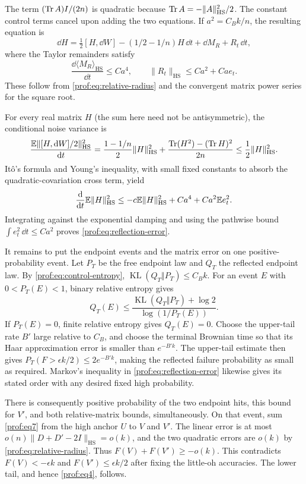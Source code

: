 The term $(\operatorname{Tr} A)I/(2n)$ is quadratic
because $\operatorname{Tr} A=-\|A\|_{\mathrm{HS}}^2/2$.  The constant control
terms cancel upon adding the two equations.  If
$a^2=C_Bk/n$, the resulting equation is
\[
 \dd H=\tfrac12[H,\dd W]-(1/2-1/n)H\,\dd t
       +\dd M_R+R_t\,\dd t,
\]
where the Taylor remainders satisfy
\[
 \frac{\dd\langle M_R\rangle_{\mathrm{HS}}}{\dd t}\le Ca^4,
 \qquad \|R_t\|_{\mathrm{HS}}\le Ca^2+Ca e_t.
\]
These follow from \eqref{prof:eq:relative-radius} and the convergent
matrix power series for the square root.

For every real matrix $H$
(the sum here need not be antisymmetric), the conditional noise
variance is
\[
 \frac{\mathbb E\|[H,\mathrm d W]/2\|_{\mathrm{HS}}^2}{\mathrm d t}
 =\frac{1-1/n}{2}\|H\|_{\mathrm{HS}}^2
 +\frac{\operatorname{Tr}(H^2)-(\operatorname{Tr} H)^2}{2n}
 \le\frac12\|H\|_{\mathrm{HS}}^2.
\]
It\^o's formula and Young's inequality, with small fixed constants
to absorb the quadratic-covariation cross term, yield
\[
 \frac{\mathrm d}{\mathrm d t}\mathbb E\|H\|_{\mathrm{HS}}^2
 \le-c\mathbb E\|H\|_{\mathrm{HS}}^2
      +Ca^4+Ca^2\mathbb E e_t^2.
\]
Integrating against the exponential damping and using the pathwise
bound $\int e_t^2\,\dd t\le Ca^2$ proves
\eqref{prof:eq:reflection-error}.

It remains to put the endpoint events and the matrix error on one
positive-probability event. Let $P_T$ be the free endpoint law and
$Q_T$ the reflected endpoint law. By \eqref{prof:eq:control-entropy},
$\operatorname{KL}(Q_T\Vert P_T)\le C_Bk$. For an event $E$ with
$0<P_T(E)<1$, binary relative entropy gives
\[
 Q_T(E)\le
 \frac{\operatorname{KL}(Q_T\Vert P_T)+\log2}
      {\log(1/P_T(E))}.
\]
If $P_T(E)=0$, finite relative entropy gives $Q_T(E)=0$.
Choose the upper-tail rate $B'$ large relative to $C_B$, and choose
the terminal Brownian time so that its Haar approximation error is
smaller than $e^{-B'k}$. The upper-tail estimate then gives
$P_T(F>\epsilon k/2)\le2e^{-B'k}$, making the reflected failure
probability as small as required. Markov's inequality in
\eqref{prof:eq:reflection-error} likewise gives its stated order
with any desired fixed high probability.

There is consequently
positive probability of the two endpoint hits, this bound for $V'$,
and both relative-matrix bounds, simultaneously.  On that event,
sum \eqref{prof:eq7} from the high anchor $U$ to $V$ and $V'$.
The linear error is at most
$o(n)\|D+D'-2I\|_{\mathrm{HS}}=o(k)$, and the two quadratic
errors are $o(k)$ by \eqref{prof:eq:relative-radius}.
Thus $F(V)+F(V')\ge-o(k)$.  This contradicts
$F(V)<-\epsilon k$ and $F(V')\le\epsilon k/2$ after fixing the
little-oh accuracies.  The lower tail, and hence
\eqref{prof:eq4}, follows.

